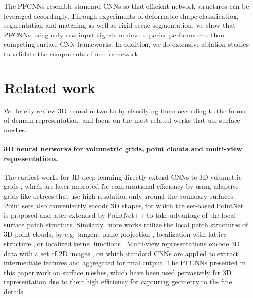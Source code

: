\documentclass[10pt,twocolumn,letterpaper]{article}
\begin{document}
The PFCNNs resemble standard CNNs so that efficient network structures can be leveraged accordingly.
Through experiments of deformable shape classification, segmentation and matching as well as rigid scene segmentation, we show that PFCNNs using only raw input signals achieve superior performances than competing surface CNN frameworks.
In addition, we do extensive ablation studies to validate the components of our framework.

 \section{Related work}
\label{sec:relatedworks}

We briefly review 3D neural networks by classifying them according to the forms of domain representation, and focus on the most related works that use surface meshes.

\vspace{-3.5mm}
\paragraph{3D neural networks for volumetric grids, point clouds and multi-view representations.}
The earliest works for 3D deep learning directly extend CNNs to 3D volumetric grids \cite{wu20153d,maturana2015voxnet}, which are later improved for computational efficiency by using adaptive grids like octrees that use high resolution only around the boundary surfaces \cite{riegler2017octnet,wang2017ocnn}. 
Point sets also conveniently encode 3D shapes, for which the set-based PointNet \cite{qi2017pointnet} is proposed and later extended by PointNet++ \cite{qi2017pointnetplusplus} to take advantage of the local surface patch structure.
Similarly, more works utilize the local patch structures of 3D point clouds, by e.g. tangent plane projection \cite{Koltun:2018:TangentConv}, localization with lattice structure \cite{su2018splatnet}, or localized kernel functions \cite{Atzmon:2018:PCN,thomas2019KPConv}.
Multi-view representations encode 3D data with a set of 2D images \cite{su15mvcnn,qi2016volumetric}, on which standard CNNs are applied to extract intermediate features and aggregated for final output.
The PFCNNs presented in this paper work on surface meshes, which have been used pervasively for 3D representation due to their high efficiency for capturing geometry to the fine details.

\vspace{-3.5mm}
\end{document}
